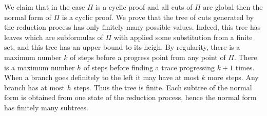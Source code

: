 \documentclass[a4paper,12pt]{article}
\newcommand{\Ind}            { {\tt Ind} }
\begin{document}


We claim that in the case $\Pi$ is a cyclic proof and all cuts of $\Pi$ are global then the normal form of $\Pi$ is a cyclic proof. We prove that the tree of cuts generated by the reduction process has only finitely many possible values. Indeed, this tree has leaves which are subformulas of $\Pi$ with applied some substitution from a finite set, and this tree has an upper bound to its heigh. By regularity, there is a maximum number $k$ of steps before a progress point from any point of $\Pi$. There is a maximum number $h$ of steps before finding a trace progressing $k+1$ times. When a branch goes definitely to the left it may have at most $k$ more steps. Any branch has at most $h$ steps. Thus the tree is finite. Each subtree of the normal form is obtained from one state of the reduction process, hence the normal form has finitely many subtrees. 
\end{document}
